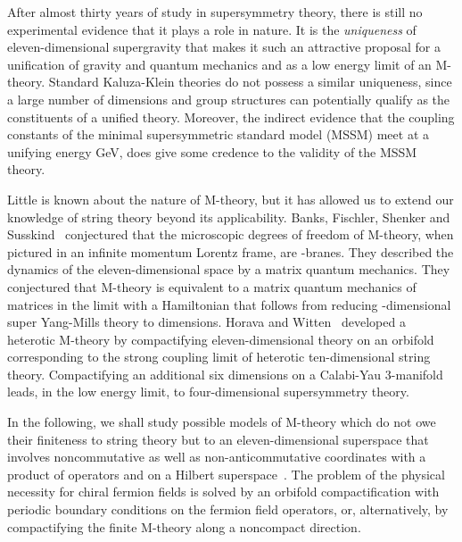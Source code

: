 \documentclass[a4paper,12pt]{article}
\begin{document}
After almost thirty years of study in supersymmetry theory, there is still
no experimental evidence that it plays a role in nature. It is the {\it
uniqueness} of eleven-dimensional supergravity that makes it such an
attractive proposal for a unification of gravity and quantum mechanics and
as a low energy limit of an M-theory. Standard Kaluza-Klein theories do not
possess a similar uniqueness, since a large number of dimensions and group
structures can potentially qualify as the constituents of a unified theory.
Moreover, the indirect evidence that the coupling constants of the minimal
supersymmetric standard model (MSSM) meet at a unifying energy \coordHE{} GeV, does give some credence to the validity of the MSSM theory.

Little is known about the nature of M-theory, but it has allowed us to
extend our knowledge of string theory beyond its applicability. Banks,
Fischler, Shenker and Susskind~\cite{Banks} conjectured that the
microscopic degrees of freedom of M-theory, when pictured in an infinite
momentum Lorentz frame, are \coordHE{}-branes. They described the dynamics of
the eleven-dimensional space by a \coordHE{} matrix quantum mechanics.
They conjectured that M-theory is equivalent to a matrix quantum mechanics
of \coordHE{} matrices in the \coordHE{} limit with a Hamiltonian
that follows from reducing \coordHE{}-dimensional \coordHE{} super Yang-Mills theory
to \coordHE{} dimensions. Horava and Witten~\cite{Horava} developed a heterotic
M-theory by compactifying eleven-dimensional theory on an \coordHE{}
orbifold corresponding to the strong coupling limit of heterotic
ten-dimensional \coordHE{} string theory. Compactifying an additional
six dimensions on a Calabi-Yau 3-manifold leads, in the low energy limit,
to four-dimensional \coordHE{} supersymmetry theory.

In the following, we shall study
possible models of M-theory which do not owe their finiteness to string
theory but to an eleven-dimensional superspace that involves
noncommutative as well as non-anticommutative coordinates with a
\coordHE{} product of operators \coordHE{} and
\coordHE{} on a Hilbert superspace~\cite{Moffat,Moffat2,Moffat3}. The
problem of the physical necessity for chiral fermion fields is solved by an
orbifold compactification with periodic boundary conditions on the fermion
field operators, or, alternatively, by compactifying the finite M-theory
along a noncompact direction.
\end{document}
